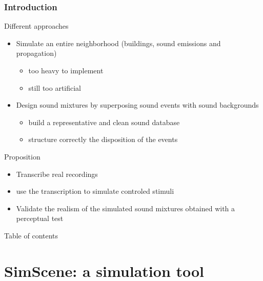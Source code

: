 \documentclass{beamer}
\begin{document}
\begin{frame}[label=pagebanale]
\frametitle{Introduction}


\begin{block}{Different approaches}
\begin{itemize}
	\item Simulate an entire neighborhood (buildings, sound emissions and propagation)
	\begin{itemize}
		\item too heavy to implement\\
		\item still too artificial \\
	\end{itemize}

	\item Design sound mixtures by superposing sound events with sound backgrounds
	\begin{itemize}
		\item build a representative and clean sound database
		\item structure correctly the disposition of the events
	\end{itemize}
\end{itemize}
\end{block}

\begin{block}{Proposition}
\begin{itemize}
	\item Transcribe real recordings
	\item use the transcription to simulate controled stimuli
	\item Validate the realism of the simulated sound mixtures obtained with a perceptual test
\end{itemize}

\end{block}


\end{frame}


\begin{frame}{Table of contents}
  \tableofcontents
\end{frame}


\section{SimScene: a simulation tool}
\end{document}
